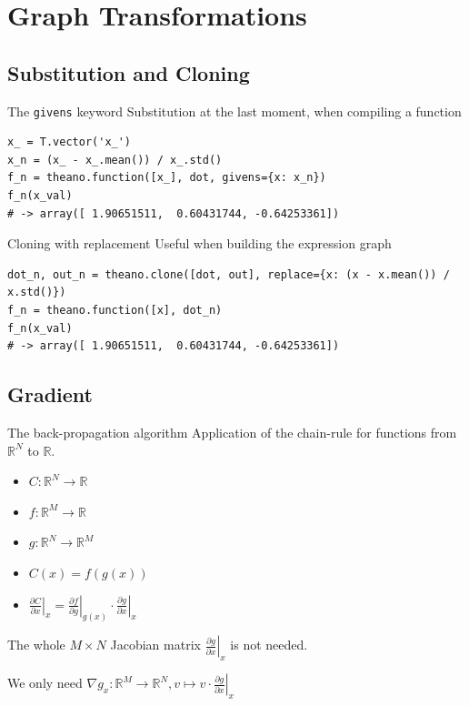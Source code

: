 \documentclass[a4paper,9pt]{beamer}
\begin{document}
\section{Graph Transformations}
\begin{frame}
  \tableofcontents[currentsection]
\end{frame}

\subsection{Substitution and Cloning}
\begin{frame}[fragile]{The {\tt givens} keyword}
  Substitution at the last moment, when compiling a function
  \begin{verbatim}
x_ = T.vector('x_')
x_n = (x_ - x_.mean()) / x_.std()
f_n = theano.function([x_], dot, givens={x: x_n})
f_n(x_val)
# -> array([ 1.90651511,  0.60431744, -0.64253361])
  \end{verbatim}
\end{frame}

\begin{frame}[fragile]{Cloning with replacement}
  Useful when building the expression graph
  \begin{verbatim}
dot_n, out_n = theano.clone([dot, out], replace={x: (x - x.mean()) / x.std()})
f_n = theano.function([x], dot_n)
f_n(x_val)
# -> array([ 1.90651511,  0.60431744, -0.64253361])
  \end{verbatim}
\end{frame}

\subsection{Gradient}
\begin{frame}{The back-propagation algorithm}
  Application of the chain-rule for functions from ${\mathbb R}^N$ to ${\mathbb R}$.
  \begin{itemize}
    \item $C: {\mathbb R}^N \rightarrow {\mathbb R}$
    \item $f: {\mathbb R}^M \rightarrow {\mathbb R}$
    \item $g: {\mathbb R}^N \rightarrow {\mathbb R}^M$
    \item $C(x) = f(g(x))$
    \item $\left.\frac{\partial C}{\partial x}\right|_x =
              \left.\frac{\partial f}{\partial g}\right|_{g(x)}
              \cdot \left.\frac{\partial g}{\partial x}\right|_x$
  \end{itemize}
  The whole $M \times N$ Jacobian matrix $\left.\frac{\partial g}{\partial x}\right|_x$
  is not needed.

  We only need $\nabla g_x: {\mathbb R}^M \rightarrow {\mathbb R}^N, v \mapsto v \cdot \left.\frac{\partial g}{\partial x}\right|_x$
\end{frame}
\end{document}
